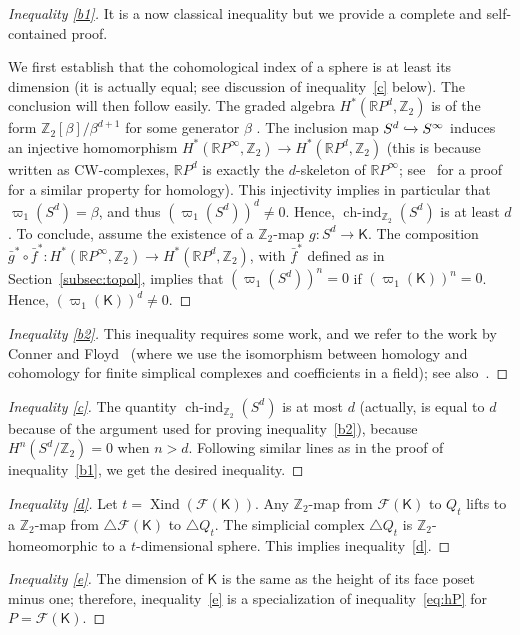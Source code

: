 \documentclass[12pt]{amsart}
\theoremstyle{definition}
\def\R{\mathbb{R}}
\def\Z{\mathbb{Z}}
\def\F{\mathcal{F}}
\def\K{\mathsf{K}}
\def\hind{\operatorname{ch-ind}_{\Z_2}}
\def\Xind{\operatorname{Xind}}
\begin{document}
\begin{proof}[Inequality \eqref{b1}] 
It is a now classical inequality but we provide a complete and self-contained proof. %

We first establish that the cohomological index of a sphere is at least its dimension (it is actually equal; see discussion of inequality~\eqref{c} below). The conclusion will then follow easily. The graded algebra $H^*(\R P^d,\Z_2)$ is of the form $\Z_2[\beta]/\beta^{d+1}$ for some generator $\beta$ \cite[Theorem 3.19]{hatcher2005algebraic}. The inclusion map $S^d \xhookrightarrow{} S^{\infty}$ induces an injective homomorphism 
$H^*(\R P^{\infty},\Z_2) \rightarrow H^*(\R P^d,\Z_2)$ (this is because written as CW-complexes, $\R P^d$ is exactly the $d$-skeleton of $\R P^{\infty}$; see~\cite[Lemma 2.34, (c)]{hatcher2005algebraic} for a proof for a similar property for homology). This injectivity implies in particular that $\varpi_1(S^d) = \beta$, and thus $(\varpi_1(S^d))^d \neq 0$. Hence, $\hind(S^d)$ is at least $d$. To conclude, assume the existence of a $\Z_2$-map $g\colon S^d \rightarrow \K$. The composition $\bar g^* \circ \bar f^*\colon H^*(\R P^{\infty},\Z_2) \rightarrow H^*(\R P^d,\Z_2)$, with $\bar f^*$ defined as in Section~\ref{subsec:topol}, implies that $(\varpi_1(S^d))^n=0$ if $(\varpi_1(\K))^n=0$. Hence, $(\varpi_1(\K))^d\neq 0$.
\end{proof}

\begin{proof}[Inequality \eqref{b2}]
This inequality requires some work, and we refer to the work by Conner and Floyd~\cite[4.7]{conner1960} (where we use the isomorphism between homology and cohomology for finite simplical complexes and coefficients in a field); see also~\cite[Corollary 3.3]{kozlov2006homology}.
\end{proof}

\begin{proof}[Inequality \eqref{c}]
The quantity $\hind(S^d)$ is at most $d$ (actually, is equal to $d$ because of the argument used for proving inequality~\eqref{b2}), because $H^n(S^d/\Z_2)=0$ when $n>d$. Following similar lines as in the proof of inequality~\eqref{b1}, we get the desired inequality.
\end{proof}

\begin{proof}[Inequality \eqref{d}]
Let $t = \Xind(\F(\K))$. Any $\Z_2$-map from $\F(\K)$ to $Q_t$ lifts to a $\Z_2$-map from $\triangle \F(\K)$ to $\triangle Q_t$. The simplicial complex $\triangle Q_t$ is $\Z_2$-homeomorphic to a $t$-dimensional sphere. This implies inequality~\eqref{d}.
\end{proof}
\begin{proof}[Inequality \eqref{e}]
The dimension of $\K$ is the same as the height of its face poset minus one; therefore, inequality~\eqref{e} is a specialization of inequality~\eqref{eq:hP} for $P=\F(\K)$.
\end{proof}
\end{document}
